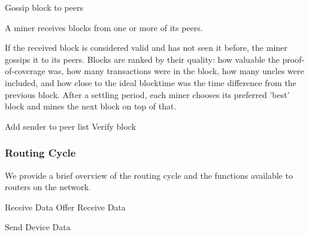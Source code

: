 \documentclass[10pt, nonatbib, nocopyrightspace, reprint]{sigplanconf}
\begin{document}
\begin{description}
    \begin{algorithm}[!htb]
      \DontPrintSemicolon
      \caption{Miner Block Submit}\label{proto:miner.block.submit}

       {
        Gossip block to peers\;
      }
    \end{algorithm}
    \FloatBarrier

  \item [Receive Block] A miner receives blocks from one or more of its peers.

    If the received block is considered valid and has not seen it before, the miner gossips it to its peers. Blocks are ranked by their quality: how valuable the proof-of-coverage was, how many transactions were in the block, how many uncles were included, and how close to the ideal blocktime was the time difference from the previous block. After a settling period, each miner chooses its preferred 'best' block and mines the next block on top of that.

    \begin{algorithm}[!htb]
      \DontPrintSemicolon
      \caption{Miner Block Receive}\label{proto:miner.block.recv}

       {
        Add sender to peer list\;
        Verify block\;
      }
    \end{algorithm}
    \FloatBarrier

\end{description}


\subsubsection{Routing Cycle}

We provide a brief overview of the routing cycle and the functions available to routers on the network.

\begin{algorithm}[!htb]
  \DontPrintSemicolon
  \caption{Router Cycle Overview}\label{cycle:router}

   {
    Receive Data Offer \;
    Receive Data \;
  }

   {
    Send Device Data \;
  }
\end{algorithm}
\FloatBarrier
\end{document}
